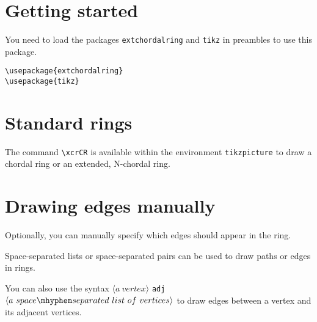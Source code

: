 \documentclass{article}
\begin{document}
\section{Getting started}

You need to load the packages \lstinline{extchordalring} and \lstinline{tikz}
in preambles to use this package.

\begin{lstlisting}
\usepackage{extchordalring}
\usepackage{tikz}
\end{lstlisting}

\section{Standard rings}

The command \lstinline{\xcrCR} is available within the environment \lstinline{tikzpicture}
to draw a chordal ring or an extended, N-chordal ring.

\begin{LTXexample}[pos=r]
\end{LTXexample}

\begin{LTXexample}[pos=r]
\end{LTXexample}

\section{Drawing edges manually}

Optionally, you can manually specify which edges should appear in the ring.

Space-separated lists or space-separated pairs can be used to draw paths or edges in rings.

\begin{LTXexample}[pos=r]
\end{LTXexample}

You can also use the syntax $\langle a\ vertex\rangle$ \lstinline{adj} $\langle a\ space\mhyphen separated\ list\ of\ vertices\rangle$ to draw edges between a vertex and its adjacent vertices.
\end{document}
